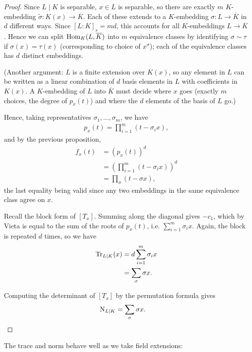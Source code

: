 \begin{proof}
	Since $L\mid K$ is separable, $x\in L$ is separable, so there are exactly $m$ $K$-embedding $\tilde{\sigma}:K(x)\to \overline{K}$. Each of these extends to a $K$-embedding $\sigma: L\to \overline{K}$ in $d$ different ways. Since $[L:K]_s=md$, this accounts for all $K$-embeddings $L\to\overline{K}$. Hence we can split $\text{Hom}_K(L,\overline{K})$ into $m$ equivalence classes by identifying $\sigma \sim \tau$ if $\sigma(x)=\tau(x)$ (corresponding to choice of $x^\sigma$); each of the equivalence classes has $d$ distinct embeddings.

	(Another argument: $L$ is a finite extension over $K(x)$, so any element in $L$ can be written as a linear combination of $d$ basis elements in $L$ with coefficients in $K(x)$. A $K$-embedding of $L$ into $\overline{K}$ must decide where $x$ goes (exactly $m$ choices, the degree of $p_x(t)$) and where the $d$ elements of the basis of $L$ go.)

	Hence, taking representatives $\sigma_1,\dots,\sigma_m$, we have
	\begin{align*}
		p_x(t) = \prod_{i=1}^m (t- \sigma_i x),
	\end{align*}
	and by the previous proposition,
	\begin{align*}
		f_x(t) &= \left( p_x(t)\right)^d\\
			&= \left(\prod_{i=1}^m (t-\sigma_i x)\right)^d\\
			&= \prod_\sigma (t-\sigma x),
	\end{align*}
	the last equality being valid since any two embeddings in the same equivalence class agree on $x$.

	Recall the block form of $[T_x]$. Summing along the diagonal gives $-c_1$, which by Vieta is equal to the sum of the roots of $p_x(t)$, i.e. $\sum_{i=1}^m \sigma_i x$. Again, the block is repeated $d$ times, so we have
	\begin{align*}
		\operatorname{Tr}_{L\mid K}(x) &= d \sum_{i=1}^m \sigma_i x\\
			&= \sum_\sigma \sigma x.
	\end{align*}

	Computing the determinant of $[T_x]$ by the permutation formula gives
	\begin{align*}
		\operatorname{N}_{L\mid K} &= \sum_\sigma \sigma x.
	\end{align*}

\end{proof}

The trace and norm behave well as we take field extensions:


